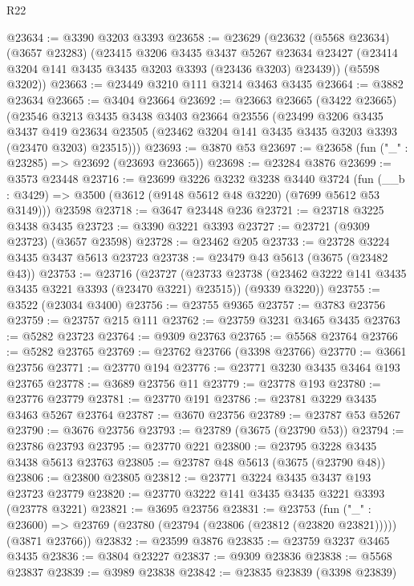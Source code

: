 \begin{lexlean}{R22}
\begin{coremodule}
@23634 := @3390 @3203 @3393
@23658 := @23629
    (@23632
      (@5568 @23634)
      (@3657 @23283)
      (@23415
        @3206
        @3435
        @3437
        @5267
        @23634
        @23427
        (@23414 @3204 @141 @3435 @3435 @3203 @3393 (@23436 @3203) @23439))
      (@5598 @3202))
@23663 := @23449 @3210 @111 @3214 @3463 @3435
@23664 := @3882 @23634
@23665 := @3404 @23664
@23692 := @23663
    @23665
    (@3422 @23665)
    (@23546
      @3213
      @3435
      @3438
      @3403
      @23664
      @23556
      (@23499
        @3206
        @3435
        @3437
        @419
        @23634
        @23505
        (@23462 @3204 @141 @3435 @3435 @3203 @3393 (@23470 @3203) @23515)))
@23693 := @3870 @53
@23697 := @23658 (fun ("_" : @23285) => @23692 (@23693 @23665))
@23698 := @23284 @3876
@23699 := @3573 @23448
@23716 := @23699
    @3226
    @3232
    @3238
    @3440
    @3724
    (fun (__b : @3429) => @3500 (@3612 (@9148 @5612 @48 @3220) (@7699 @5612 @53 @3149)))
    @23598
@23718 := @3647 @23448 @236
@23721 := @23718 @3225 @3438 @3435
@23723 := @3390 @3221 @3393
@23727 := @23721 (@9309 @23723) (@3657 @23598)
@23728 := @23462 @205
@23733 := @23728 @3224 @3435 @3437 @5613 @23723
@23738 := @23479 @43 @5613 (@3675 (@23482 @43))
@23753 := @23716
    (@23727
      (@23733 @23738 (@23462 @3222 @141 @3435 @3435 @3221 @3393 (@23470 @3221) @23515))
      (@9339 @3220))
@23755 := @3522 (@23034 @3400)
@23756 := @23755 @9365
@23757 := @3783 @23756
@23759 := @23757 @215 @111
@23762 := @23759 @3231 @3465 @3435
@23763 := @5282 @23723
@23764 := @9309 @23763
@23765 := @5568 @23764
@23766 := @5282 @23765
@23769 := @23762 @23766 (@3398 @23766)
@23770 := @3661 @23756
@23771 := @23770 @194
@23776 := @23771 @3230 @3435 @3464 @193 @23765
@23778 := @3689 @23756 @11
@23779 := @23778 @193
@23780 := @23776 @23779
@23781 := @23770 @191
@23786 := @23781 @3229 @3435 @3463 @5267 @23764
@23787 := @3670 @23756
@23789 := @23787 @53 @5267
@23790 := @3676 @23756
@23793 := @23789 (@3675 (@23790 @53))
@23794 := @23786 @23793
@23795 := @23770 @221
@23800 := @23795 @3228 @3435 @3438 @5613 @23763
@23805 := @23787 @48 @5613 (@3675 (@23790 @48))
@23806 := @23800 @23805
@23812 := @23771 @3224 @3435 @3437 @193 @23723 @23779
@23820 := @23770 @3222 @141 @3435 @3435 @3221 @3393 (@23778 @3221)
@23821 := @3695 @23756
@23831 := @23753
    (fun ("_" : @23600) =>
    @23769 (@23780 (@23794 (@23806 (@23812 (@23820 @23821))))) (@3871 @23766))
@23832 := @23599 @3876
@23835 := @23759 @3237 @3465 @3435
@23836 := @3804 @23227
@23837 := @9309 @23836
@23838 := @5568 @23837
@23839 := @3989 @23838
@23842 := @23835 @23839 (@3398 @23839)

\end{coremodule}
\end{lexlean}
